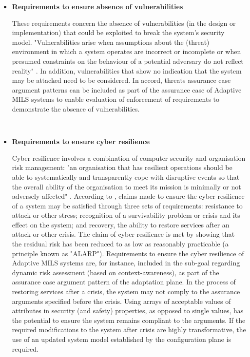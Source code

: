 \documentclass[12pt,twoside,a4paper]{article}
\begin{document}
\begin{itemize}
\item \textbf{Requirements to ensure absence of vulnerabilities}
 
These requirements concern the absence of vulnerabilities (in the design or implementation) that could be exploited to break the system's security model. "Vulnerabilities arise when assumptions about the (threat) environment in which a system operates are incorrect or incomplete or when presumed constraints on the behaviour of a potential adversary do not reflect reality"  \cite{Lipson13evidence-of-assurance}. In addition, vulnerabilities that show no indication that the system may be attacked need to be considered. In accord, threats assurance case argument patterns can be included as part of the assurance case of Adaptive MILS systems to enable evaluation of enforcement of requirements to demonstrate the absence of vulnerabilities.  

~\\
\item \textbf{Requirements to ensure cyber resilience}

Cyber resilience involves a combination of computer security and organisation risk management: "an organisation that has resilient operations should be able to systematically and transparently cope with disruptive events so that the overall ability of the organisation to meet its mission is minimally or not adversely affected" \cite{Lipson13evidence-of-assurance}. According to \cite{Lipson13evidence-of-assurance}, claims made to ensure the cyber resilience of a system may be satisfied through three sets of requirements: resistance to attack or other stress; recognition of a survivability problem or crisis and its effect on the system; and recovery, the ability to restore services after an attack or other crisis. The claim of cyber resilience is met by showing that the residual risk has been reduced to as low as reasonably practicable (a principle known as "ALARP").
Requirements to ensure the cyber resilience of Adaptive MILS systems are, for instance, included in the sub-goal regarding dynamic risk assessment (based on context-awareness), as part of the assurance case argument pattern of the adaptation plane. 
In the process of restoring services after a crisis, the system may not comply to the assurance arguments specified before the crisis. Using arrays of acceptable values of attributes in security (and safety) properties, as opposed to single values, has the potential to ensure the system remains compliant to the arguments. If the required modifications to the system after crisis are highly transformative, the use of an updated system model established by the configuration plane is required. 
\end{itemize}
\end{document}
